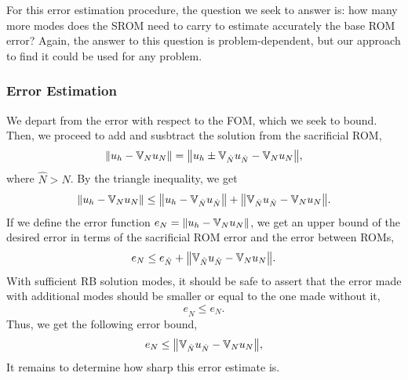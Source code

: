 \documentclass[../../thesis.tex]{subfiles}
\newcommand{\rbV}{\ensuremath{\mathbb{V}}}
\begin{document}
For this error estimation procedure, the question we seek to answer is:
how many more modes does the SROM need to carry to estimate accurately the base ROM error?
Again, the answer to this question is problem-dependent,
but our approach to find it could be used for any problem.

\subsubsection{Error Estimation}
We depart from the error with respect to the FOM, which we seek to bound.
Then, we proceed to add and susbtract the solution from the sacrificial ROM,
\begin{equation}
    \norm{u_h - \rbV_{N} u_N} = \norm{u_h \pm \rbV_{\hat{N}} u_{\hat{N}} - \rbV_{N} u_{N}},
\end{equation}
where $\hat{N} > N$. 
By the triangle inequality, we get
\begin{equation}
    \norm{u_h - \rbV_{N} u_N} \leq \norm{u_h - \rbV_{\hat{N}} u_{\hat{N}}} + \norm{\rbV_{\hat{N}} u_{\hat{N}} - \rbV_{N} u_{N}}.
\end{equation}
If we define the error function $e_N = \norm{u_h - \rbV_{N} u_N}$, 
we get an upper bound of the desired error in terms of the sacrificial ROM error and the error between ROMs,
\begin{equation}
    e_N \leq e_{\hat{N}} + \norm{\rbV_{\hat{N}} u_{\hat{N}} - \rbV_{N} u_{N}}.
\end{equation}
With sufficient RB solution modes, it should be safe to assert that the error made 
with additional modes should be smaller or equal to the one made without it,
\begin{equation}
    e_{\hat{N}} \leq e_{N}.
\end{equation}
Thus, we get the following error bound,
\begin{equation}
    e_N \leq \norm{\rbV_{\hat{N}} u_{\hat{N}} - \rbV_{N} u_{N}},
\end{equation}
It remains to determine how sharp this error estimate is.
\end{document}
